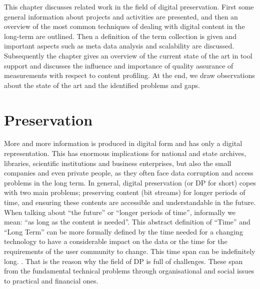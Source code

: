 This chapter discusses related work in the field of digital preservation.
First some general information about projects and activities are presented, and then an overview of the most common techniques of dealing with digital content in the long-term are outlined.
Then a definition of the term collection is given and important aspects such as meta data analysis and scalability are discussed.
Subsequently the chapter gives an overview of the current state of the art in tool support and discusses the influence and importance of quality assurance of measurements with respect to content profiling.
At the end, we draw observations about the state of the art and the identified problems and gaps.

\section{Preservation}
More and more information is produced in digital form and has only a digital representation.
This has enormous implications for national and state archives, libraries, scientific institutions and business enterprises, but also the small companies and even private people, as they often face data corruption and access problems in the long term.
In general, digital preservation (or DP for short) copes with two main problems; preserving content (bit streams) for longer periods of time, and ensuring these contents are accessible and understandable in the future.
When talking about ``the future'' or ``longer periods of time'', informally we mean: ``as long as the content is needed''. This abstract definition of ``Time'' and ``Long Term'' can be more formally defined by the time needed for a changing technology to have a considerable impact on the data or the time for the requirements of the user community to change. This time span can be indefinitely long. \cite{citeulike:1971545}.
That is the reason why the field of DP is full of challenges. These span from the fundamental technical problems through organisational and social issues to practical and financial ones.

